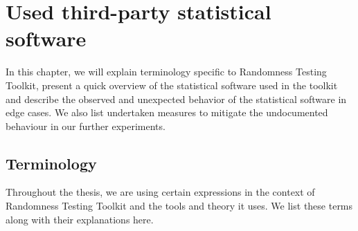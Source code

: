 \documentclass[
	digital,    %
	oneside,
	color,
	11pt,
	nocover,
	notable,
	nolof,
	nolot,
]{fithesis3}
\theoremstyle{definition}
\theoremstyle{remark}
\begin{document}
\chapter{Used third-party statistical software}
\label{chap:batteries}
In this chapter, we will explain terminology specific to Randomness Testing Toolkit, present a quick overview of the statistical software used in the toolkit and describe the observed and unexpected behavior of the statistical software in edge cases. We also list undertaken measures to mitigate the undocumented behaviour in our further experiments.

\section{Terminology}
\label{sec:terminology}
Throughout the thesis, we are using certain expressions in the context of Randomness Testing Toolkit and the tools and theory it uses. We list these terms along with their explanations here.
\end{document}
